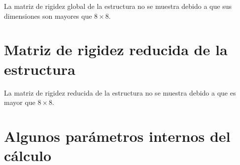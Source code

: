 \documentclass[a4paper,11pt]{article}
\begin{document}
La matriz de rigidez global de la estructura no se muestra debido a que sus dimensiones son mayores que $8\times8$.   

\section{Matriz de rigidez reducida de la estructura}   

La matriz de rigidez reducida de la estructura no se muestra debido a que es mayor que $8\times8$.   

\newpage       

\section{Algunos parámetros internos del cálculo}       
\end{document}
